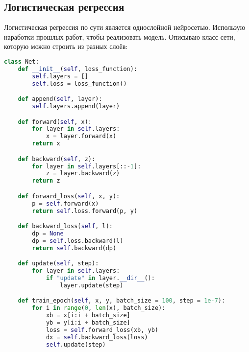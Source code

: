 \subsection{Логистическая регрессия}
Логистическая регрессия по сути является однослойной нейросетью. Использую наработки прошлых работ, чтобы реализовать модель. Описываю класс сети, которую можно строить из разных слоёв:
\begin{lstlisting}[language=Python]
class Net:
    def __init__(self, loss_function):
        self.layers = []
        self.loss = loss_function()

    def append(self, layer):
        self.layers.append(layer)

    def forward(self, x):
        for layer in self.layers:
            x = layer.forward(x)
        return x

    def backward(self, z):
        for layer in self.layers[::-1]:
            z = layer.backward(z)
        return z

    def forward_loss(self, x, y):
        p = self.forward(x)
        return self.loss.forward(p, y)

    def backward_loss(self, l):
        dp = None
        dp = self.loss.backward(l)
        return self.backward(dp)

    def update(self, step):
        for layer in self.layers:
            if "update" in layer.__dir__():
                layer.update(step)

    def train_epoch(self, x, y, batch_size = 100, step = 1e-7):
        for i in range(0, len(x), batch_size):
            xb = x[i:i + batch_size]
            yb = y[i:i + batch_size]
            loss = self.forward_loss(xb, yb)
            dx = self.backward_loss(loss)
            self.update(step)
\end{lstlisting}
\pagebreak

